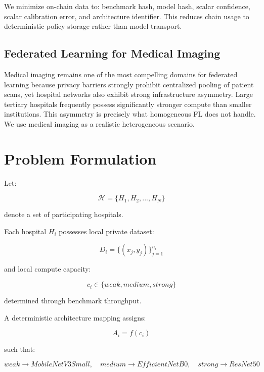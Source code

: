 \documentclass[conference]{IEEEtran}
\begin{document}
We minimize on-chain data to: benchmark hash, model hash, scalar confidence, scalar calibration error, and architecture identifier. This reduces chain usage to deterministic policy storage rather than model transport.

\subsection{Federated Learning for Medical Imaging}

Medical imaging remains one of the most compelling domains for federated learning because privacy barriers strongly prohibit centralized pooling of patient scans, yet hospital networks also exhibit strong infrastructure asymmetry. Large tertiary hospitals frequently possess significantly stronger compute than smaller institutions. This asymmetry is precisely what homogeneous FL does not handle. We use medical imaging as a realistic heterogeneous scenario.

\section{Problem Formulation}

Let:

\begin{equation}
\mathcal{H} = \{H_1, H_2, ..., H_N\}
\end{equation}

denote a set of participating hospitals.

Each hospital $H_i$ possesses local private dataset:

\begin{equation}
D_i = \{(x_j,y_j)\}_{j=1}^{n_i}
\end{equation}

and local compute capacity:

\begin{equation}
c_i \in \{weak, medium, strong\}
\end{equation}

determined through benchmark throughput.

A deterministic architecture mapping assigns:

\begin{equation}
A_i = f(c_i)
\end{equation}

such that:

\begin{equation}
weak \rightarrow MobileNetV3Small, \quad medium \rightarrow EfficientNetB0, \quad strong \rightarrow ResNet50
\end{equation}
\end{document}
